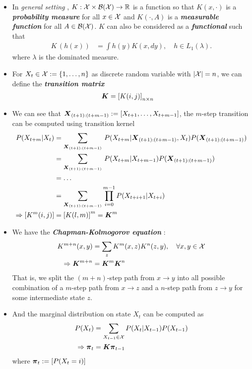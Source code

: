 \documentclass[11pt]{article}
\begin{document}
\begin{itemize}
\item In \emph{general setting} \citep{robert1999monte}, $K: {\mathcal X} \times {\mathcal B}({\mathcal X}) \rightarrow {\mathbb R}$ is a function so that $K(x, \cdot)$ is a \emph{\textbf{probability measure}} for all $x\in {\mathcal X}$ and $K(\cdot, A)$ is a \emph{\textbf{measurable function}} for all $A\in {\mathcal B}({\mathcal X})$. $K$ can also be considered as a \emph{\textbf{functional}} such that
\begin{align*}
K\,(h(x)) &= \int h(y) K(x, dy), \quad h \in L_1(\lambda).
\end{align*} where $\lambda$ is the dominated measure.


\item For $X_t \in {\mathcal X}:= \left\{1, \ldots, n\right\}$ as discrete random variable with $\left\lvert {\mathcal X} \right\rvert = n$, we can define the \textbf{\emph{transition matrix}}
\begin{align}
\boldsymbol{K} &= \left[K(i,j)\right]_{n\times n} \label{eqn: mc_kernel_mat}
\end{align}

\item We can see that $\boldsymbol{X}_{(t+1):(t+m-1)} := [X_{t+1}, \ldots, X_{t+m-1}]$, the $m$-step transition can be computed using transition kernel
\begin{align}
P(X_{t+m}| X_t) &= \sum_{\boldsymbol{X}_{(t+1):(t+m-1)}}\,P(X_{t+m} |\boldsymbol{X}_{(t+1):(t+m-1)} , X_t)P(\boldsymbol{X}_{(t+1):(t+m-1)}) \nonumber\\
&= \sum_{\boldsymbol{X}_{(t+1):(t+m-1)}}\,P(X_{t+m} |X_{t+m-1})P(\boldsymbol{X}_{(t+1):(t+m-1)}) \nonumber\\
&= \ldots \nonumber\\
&= \sum_{\boldsymbol{X}_{(t+1):(t+m-1)}}\prod_{i=0}^{m-1}P(X_{t+i+1}|X_{t+i}) \label{eqn: mc_kernel_m_kernel_prod}\\
\Rightarrow \left[K^{m}(i, j)\right] &= \left[K(l, m)\right]^{m} = \boldsymbol{K}^{m}  \label{eqn: mc_kernel_m_kernel_prod_mat}
\end{align}

\item We have the \emph{\textbf{Chapman-Kolmogorov equation}} \citep{ross2014introduction}:
\begin{align}
K^{m+n}(x, y)  &= \sum_{z}K^{m}(x, z)K^{n}(z, y), \quad \forall x,y \in {\mathcal X} \label{eqn: mc_ck_eqn}\\
\Rightarrow \boldsymbol{K}^{m+n} &= \boldsymbol{K}^{m}\boldsymbol{K}^{n} \nonumber
\end{align} That is, we split the  $(m+n)$-step path from $x\rightarrow y$ into all possible combination of a $m$-step path from $x\rightarrow z$ and a $n$-step path from $z \rightarrow y$ for some intermediate state $z$.

\item And the marginal distribution on state $X_t$ can be computed as
\begin{align}
P(X_t) &= \sum_{X_{t-1}\in {\mathcal X}}P(X_t|X_{t-1})P(X_{t-1}) \nonumber\\
\Rightarrow \boldsymbol{\pi}_{t} &= \boldsymbol{K}\boldsymbol{\pi}_{t-1} \label{eqn: mc_marginal_kernel}
\end{align} where $\boldsymbol{\pi}_{t}:= [P(X_t = i)]$
\end{itemize}
\end{document}

